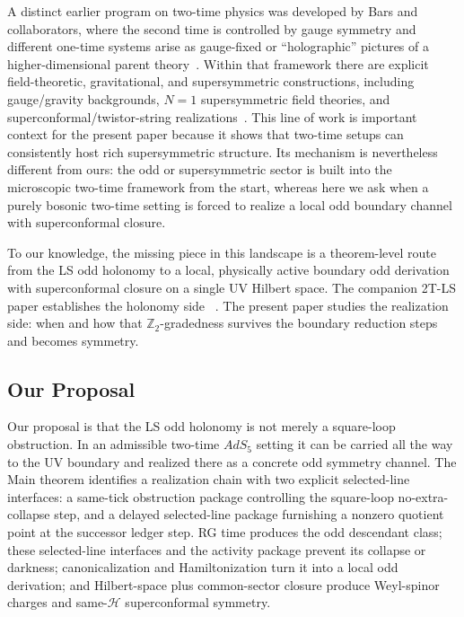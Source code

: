 \documentclass[
  aps,
  prd,
  onecolumn,
  notitlepage,
  nofootinbib,
  superscriptaddress,
  10pt
]{revtex4-2}
\theoremstyle{definition}
\theoremstyle{plain}
\begin{document}
A distinct earlier program on two-time physics was developed by Bars and
collaborators, where the second time is controlled by gauge symmetry and
different one-time systems arise as gauge-fixed or ``holographic'' pictures of
a higher-dimensional parent theory~\cite{BarsKounnas1997,Bars2001Survey,Bars2000FieldTheory}.
Within that framework there are explicit field-theoretic, gravitational, and
supersymmetric constructions, including gauge/gravity backgrounds,
\(N=1\) supersymmetric field theories, and superconformal/twistor-string
realizations~\cite{Bars2000GaugeGravityBackgrounds,BarsKuo2007SUSYFieldTheory,BarsKuo2007NOnePRL,Bars2004TwistorSuperstring}.
This line of work is important context for the present paper because it shows
that two-time setups can consistently host rich supersymmetric structure.  Its
mechanism is nevertheless different from ours: the odd or supersymmetric sector
is built into the microscopic two-time framework from the start, whereas here
we ask when a purely bosonic two-time setting is forced to realize a local odd boundary channel with
superconformal closure.

To our knowledge, the missing piece in this landscape is a theorem-level route
from the LS odd holonomy to a local, physically active boundary odd
derivation with superconformal closure on a single UV Hilbert space.  The
companion 2T-LS paper establishes the holonomy side
~\cite{Surdu2TLSLetter2026}.  The present paper studies the realization side:
when and how that \(\mathbb{Z}_2\)-gradedness survives the boundary reduction steps and
becomes symmetry.

\subsection{Our Proposal}

Our proposal is that the LS odd holonomy is not merely a square-loop
obstruction.  In an admissible two-time \(AdS_5\) setting it can be carried all
the way to the UV boundary and realized there as a concrete odd symmetry
channel.  The Main theorem identifies a realization chain with two explicit
selected-line interfaces: a same-tick obstruction package controlling the
square-loop no-extra-collapse step, and a delayed selected-line package
furnishing a nonzero quotient point at the successor ledger step.  RG time
produces the odd descendant class; these selected-line interfaces and the
activity package prevent its collapse or darkness; canonicalization and
Hamiltonization turn it into a local odd derivation; and Hilbert-space plus
common-sector closure produce
Weyl-spinor charges and same-\(\mathcal H\) superconformal symmetry.
\end{document}
